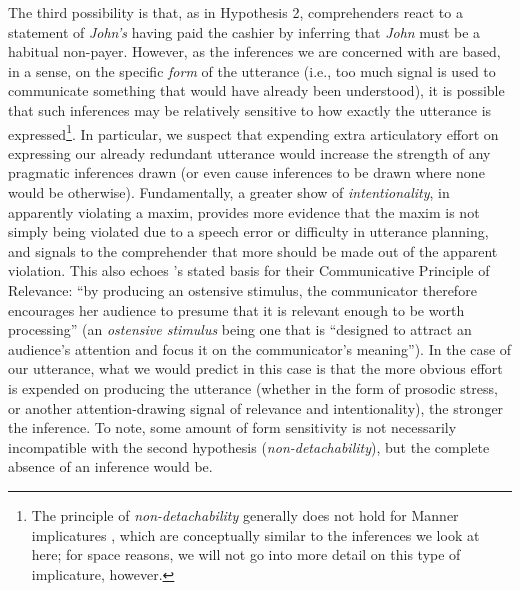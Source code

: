 The third possibility is that, as in Hypothesis 2, comprehenders react
to a statement of \emph{John's} having paid the cashier by inferring
that \emph{John} must be a habitual non-payer. However, as the
inferences we are concerned with are based, in a sense, on the specific
\emph{form} of the utterance (i.e., too much signal is used to
communicate something that would have already been understood), it is
possible that such inferences may be relatively sensitive to how exactly
the utterance is expressed\footnote{The principle of
  \emph{non-detachability} generally does not hold for Manner
  implicatures \citep{Grice1975}, which are conceptually similar to the
  inferences we look at here; for space reasons, we will not go into
  more detail on this type of implicature, however.}. In particular, we
suspect that expending extra articulatory effort on expressing our
already redundant utterance would increase the strength of any pragmatic
inferences drawn (or even cause inferences to be drawn where none would
be otherwise). Fundamentally, a greater show of \emph{intentionality},
in apparently violating a maxim, provides more evidence that the maxim
is not simply being violated due to a speech error or difficulty in
utterance planning, and signals to the comprehender that more should be
made out of the apparent violation. This also echoes \citet{Wilson2004}'s stated basis for their Communicative Principle of Relevance:
\enquote{by producing an ostensive stimulus, the communicator therefore
encourages her audience to presume that it is relevant enough to be
worth processing} (an \emph{ostensive stimulus} being one that is
\enquote{designed to attract an audience's attention and focus it on the
communicator's meaning}). In the case of our utterance, what we would
predict in this case is that the more obvious effort is expended on
producing the utterance (whether in the form of prosodic stress, or
another attention-drawing signal of relevance and intentionality), the
stronger the inference. To note, some amount of form sensitivity is not
necessarily incompatible with the second hypothesis
(\emph{non-detachability}), but the complete absence of an inference
would be.

